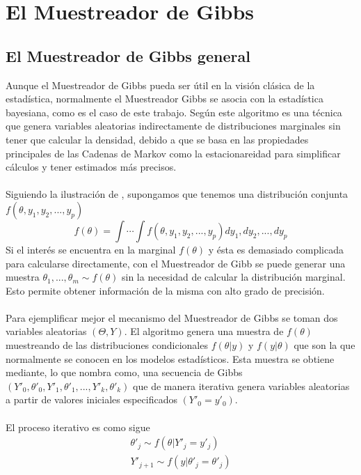 \chapter{El Muestreador de Gibbs}
\section{El Muestreador de Gibbs general}
Aunque el Muestreador de Gibbs pueda ser \'util en la visi\'on cl\'asica de la estad\'istica, normalmente el Muestreador Gibbs se asocia con la estad\'istica bayesiana, como es el caso de este trabajo. Seg\'un \cite{casella1992explaining} este algoritmo es una t\'ecnica que genera variables aleatorias indirectamente de distribuciones marginales sin tener que calcular la densidad, debido a que se basa en las propiedades principales de las Cadenas de Markov como la estacionareidad para simplificar c\'alculos y tener estimados m\'as precisos.\\
\\
Siguiendo la ilustraci\'on de \cite{casella1992explaining}, supongamos que tenemos una distribuci\'on conjunta $f(\theta,y_1,y_2,...,y_p)$\\
\[f(\theta)=\int \cdots \int f(\theta,y_1,y_2,...,y_p) dy_1,dy_2,...,dy_p\]
Si el inter\'es se encuentra en la marginal $f(\theta)$ y \'esta es demasiado complicada para calcularse directamente, con el Muestreador de Gibb se puede generar una muestra $\theta_1,...,\theta_m \sim f(\theta)$ sin la necesidad de calcular la distribuci\'on marginal. Esto permite obtener informaci\'on de la misma con alto grado de precisi\'on.\\
\\
Para ejemplificar mejor el mecanismo del Muestreador de Gibbs se toman dos variables aleatorias $(\Theta,Y)$. El algoritmo genera una muestra de $f(\theta)$ muestreando de las distribuciones condicionales $f(\theta|y)$ y $f(y|\theta)$ que son la que normalmente se conocen en los modelos estad\'isticos. Esta muestra se obtiene mediante, lo que \cite{casella1992explaining} nombra como, una secuencia de Gibbs $(Y'_0,\theta'_0,Y'_1,\theta'_1,...,Y'_k,\theta'_k)$ que de manera iterativa genera variables aleatorias a partir de valores iniciales especificados $(Y'_0=y'_0)$.\\
\\El proceso iterativo es como sigue\\
\begin{align*}
\theta'_j \sim f(\theta|Y'_j=y'_j)\\
Y'_{j+1} \sim f(y|\theta'_j=\theta'_j)
\end{align*}
